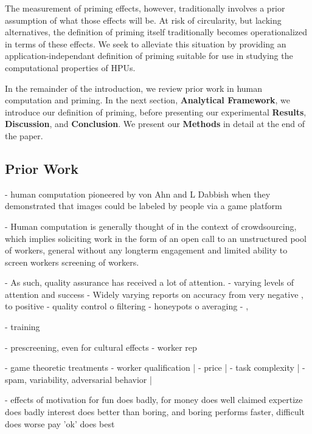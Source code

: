 \documentclass[a4paper]{report}
\begin{document}
The measurement of priming effects, however, traditionally involves a prior
assumption of what those effects will be.  At risk of circularity, but lacking
alternatives, the definition of priming itself traditionally becomes 
operationalized in terms of these effects\cite{}.  We seek to alleviate this 
situation by providing an application-independant definition of priming 
suitable for use in studying the computational properties of HPUs.

In the remainder of the introduction, we review prior work in human 
computation and priming.  In the next section, \textbf{Analytical Framework},
we introduce our definition of priming, before presenting our experimental 
\textbf{Results}, \textbf{Discussion}, and \textbf{Conclusion}.  
We present our \textbf{Methods} in detail at the end of the paper.

\subsection*{Prior Work}
- human computation pioneered by von Ahn and L Dabbish when they demonstrated
	that images could be labeled by people via a game platform
	\cite{von2004labeling}

- Human computation is generally thought of in the context of crowdsourcing,
	which implies soliciting work in the form of an open call to an 
	unstructured pool of workers, general without any longterm engagement and 
	limited ability to screen workers screening of workers. 
	\cite{howe2008crowdsourcing}

- As such, quality assurance has received a lot of attention.
	- varying levels of attention and success \cite{kazai2013analysis}
	- Widely varying reports on accuracy from very negative 
	\cite{marsden2009crowdsourcing}, to positive 
	\cite{alonso2009can, grady2010crowdsourcing}
	- quality control \cite{lease2011quality}
		o filtering 
			- honeypots	\cite{snow2008cheap}
		o averaging
		- \cite{alonso2009can}, \cite{paolacci2010running}

	- training \cite{le2010ensuring}

	- prescreening, even for cultural effects
		\cite{paolacci2010running}
			- worker rep
			
	- game theoretic treatments
	- worker qualification 					  |	
	- price									  | \cite{kazai2013analysis}
	- task complexity						  |
	- spam, variability, adversarial behavior |


- effects of motivation
	for fun does badly, for money does well
	claimed expertize does badly
	interest does better than boring, and boring performs faster, 
	difficult does worse
	pay 'ok' does best
\end{document}
